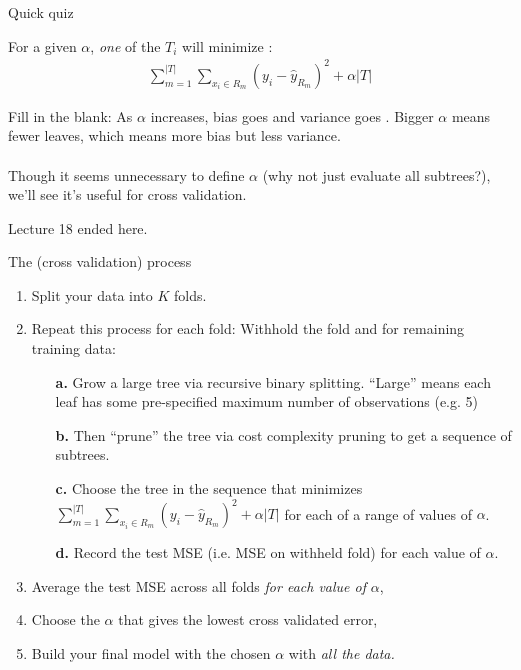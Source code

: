 \documentclass[mathserif, aspectratio=169]{beamer}
\begin{document}
\begin{frame}{Quick quiz}

For a given $\alpha$, \textit{one} of the $T_i$ will minimize :
\begin{align*}
\sum_{m=1}^{|T|} \sum_{x_i\in R_m} (y_i-\hat{y}_{R_m})^2+\alpha|T|
\end{align*}

Fill in the blank:  As $\alpha$ increases, bias goes \underline{} and variance goes \underline{}.  
%
\pause
%
Bigger $\alpha$ means fewer leaves, which means more bias but less variance.   \\~\\

Though it seems unnecessary to define $\alpha$ (why not just evaluate all subtrees?), we'll see it's useful for cross validation.  
\end{frame}

\begin{frame}
	Lecture 18 ended here.
\end{frame}

\begin{frame}{The (cross validation) process}

\begin{enumerate}
\item Split your data into $K$ folds.  
\vspace{3mm}
\item Repeat this process for each fold: Withhold the fold and for remaining training data:
\begin{enumerate}
\item[\textbf{a.}] Grow a large tree via recursive binary splitting.  ``Large'' means each leaf has some pre-specified maximum number of observations (e.g. 5)
\item[\textbf{b.}] Then ``prune'' the tree via cost complexity pruning to get a sequence of subtrees.  
\item[\textbf{c.}] Choose the tree in the sequence that minimizes $\sum_{m=1}^{|T|} \sum_{x_i\in R_m} (y_i-\hat{y}_{R_m})^2+\alpha|T|$ for each of a range of values of $\alpha$.
\item[\textbf{d.}] Record the test MSE (i.e. MSE on withheld fold) for each value of $\alpha$.
\vspace{3mm}
\end{enumerate}
\item Average the test MSE across all folds \textit{for each value of }$\alpha$, 
\vspace{3mm}
\item Choose the $\alpha$ that gives the lowest cross validated error, 
\vspace{3mm}
\item Build your final model with the chosen $\alpha$ with \textit{all the data.}
\end{enumerate}
\end{frame}
\end{document}
